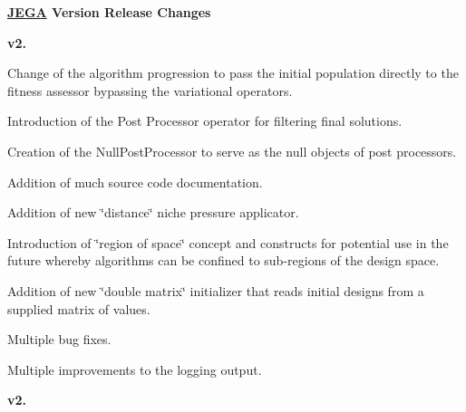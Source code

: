 {\bfseries \hyperlink{namespaceJEGA}{J\+E\+GA} Version Release Changes}

{\bfseries v2.}
\begin{DoxyItemize}
\item Change of the algorithm progression to pass the initial population directly to the fitness assessor bypassing the variational operators.
\item Introduction of the Post Processor operator for filtering final solutions.
\begin{DoxyItemize}
\item Creation of the Null\+Post\+Processor to serve as the null objects of post processors.
\end{DoxyItemize}
\item Addition of much source code documentation.
\item Addition of new \char`\"{}distance\char`\"{} niche pressure applicator.
\item Introduction of \char`\"{}region of space\char`\"{} concept and constructs for potential use in the future whereby algorithms can be confined to sub-\/regions of the design space.
\item Addition of new \char`\"{}double matrix\char`\"{} initializer that reads initial designs from a supplied matrix of values.
\item Multiple bug fixes.
\item Multiple improvements to the logging output.
\end{DoxyItemize}

{\bfseries v2.}


